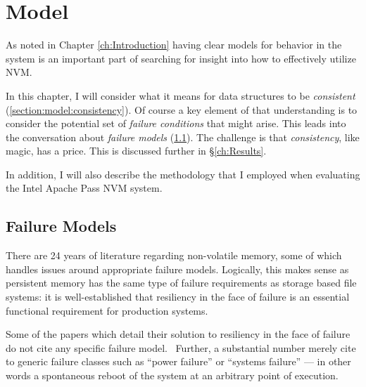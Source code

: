 
\chapter{Model}
\label{ch:Model}

As noted in Chapter \ref{ch:Introduction} having clear models for behavior in the system
is an important part of searching for insight into how to effectively utilize \acs{NVM}.

In this chapter, I will consider what it means for data structures to be \textit{consistent} (\ref{section:model:consistency}).
Of course a key element of that understanding is to consider the potential set of \textit{failure conditions} that might arise.
This leads into the conversation about \textit{failure models} (\ref{section:model:failure}).
The challenge is that \textit{consistency}, like magic, has a price.  This is discussed further in \S \ref{ch:Results}.

In addition, I will also describe the methodology that I employed when evaluating the Intel Apache Pass
\acs{NVM} system. 

\section{Failure Models}\label{section:model:failure}

There are 24 years of literature regarding non-volatile memory, 
some of which handles issues around appropriate failure models.
Logically, this makes sense as persistent memory has the same
type of failure requirements as storage based file systems: it
is well-established that resiliency in the face of failure is
an essential functional requirement for production systems.~\cite{oukid2016testing,ou2016fast}

Some of the papers which detail their solution to resiliency
in the face of failure do not cite any specific failure model.~\cite{shan2017distributed,
wang2017hardware,wu2018espresso} 
Further, a substantial number merely cite to generic failure
classes such as ``power failure'' or ``systems failure'' --- in
other words a spontaneous reboot of the system at an arbitrary
point of execution.~\cite{bhandari2012implications,condit2009better,hitz1994file,wu1994envy,bailey2011operating,moraru2013consistent,zhao2013kiln,park2013failure,lu2014loose,liang2016case,liu2017durable,joshi2017atom}


